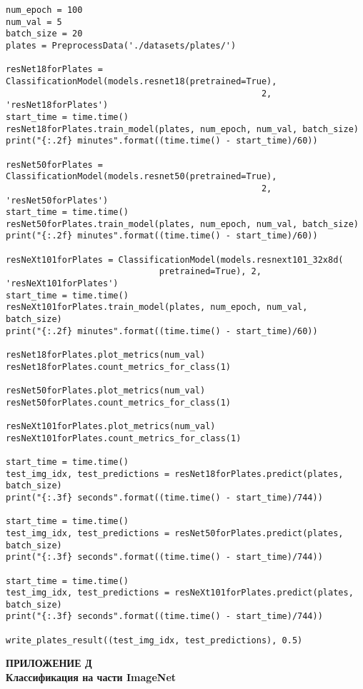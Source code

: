 \begin{verbatim}
num_epoch = 100
num_val = 5
batch_size = 20
plates = PreprocessData('./datasets/plates/')

resNet18forPlates = ClassificationModel(models.resnet18(pretrained=True),
                                                  2, 'resNet18forPlates')
start_time = time.time()
resNet18forPlates.train_model(plates, num_epoch, num_val, batch_size)
print("{:.2f} minutes".format((time.time() - start_time)/60))

resNet50forPlates = ClassificationModel(models.resnet50(pretrained=True),
                                                  2, 'resNet50forPlates')
start_time = time.time()
resNet50forPlates.train_model(plates, num_epoch, num_val, batch_size)
print("{:.2f} minutes".format((time.time() - start_time)/60))

resNeXt101forPlates = ClassificationModel(models.resnext101_32x8d(
                              pretrained=True), 2, 'resNeXt101forPlates')
start_time = time.time()
resNeXt101forPlates.train_model(plates, num_epoch, num_val, batch_size)
print("{:.2f} minutes".format((time.time() - start_time)/60))

resNet18forPlates.plot_metrics(num_val)
resNet18forPlates.count_metrics_for_class(1)

resNet50forPlates.plot_metrics(num_val)
resNet50forPlates.count_metrics_for_class(1)

resNeXt101forPlates.plot_metrics(num_val)
resNeXt101forPlates.count_metrics_for_class(1)

start_time = time.time()
test_img_idx, test_predictions = resNet18forPlates.predict(plates, batch_size)
print("{:.3f} seconds".format((time.time() - start_time)/744))

start_time = time.time()
test_img_idx, test_predictions = resNet50forPlates.predict(plates, batch_size)
print("{:.3f} seconds".format((time.time() - start_time)/744))

start_time = time.time()
test_img_idx, test_predictions = resNeXt101forPlates.predict(plates, batch_size)
print("{:.3f} seconds".format((time.time() - start_time)/744))

write_plates_result((test_img_idx, test_predictions), 0.5)
\end{verbatim}
\newpage\normalsize
\begin{center}
	\textbf{ПРИЛОЖЕНИЕ Д\\ Классификация на части ImageNet}
\end{center}
